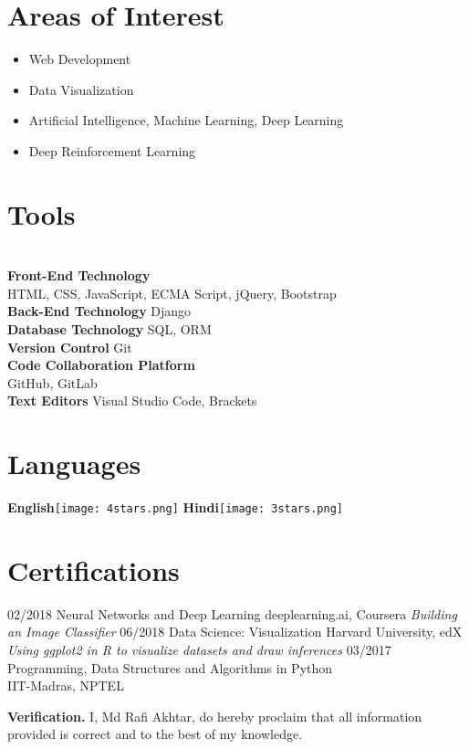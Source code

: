 \documentclass[]{friggeri-cv}
\begin{document}
\section{Areas of Interest}
\begin{itemize}
    \item Web Development
    \item Data Visualization
    \item Artificial Intelligence, Machine Learning, Deep Learning
    \item Deep Reinforcement Learning
\end{itemize}

\begin{aside}
\section{Tools}
\textbf{\\Front-End Technology} {\\HTML, CSS, JavaScript, ECMA Script, jQuery, Bootstrap}
\textbf{\\Back-End Technology} {Django}
\textbf{\\Database Technology} {SQL, ORM}
\textbf{\\Version Control} {Git}
\textbf{\\Code Collaboration Platform} {\\GitHub, GitLab}
\textbf{\\Text Editors} {Visual Studio Code, Brackets}
    ~
  \section{Languages}
    \textbf{English}\texttt{[image: 4stars.png]}
    \textbf{Hindi}\texttt{[image: 3stars.png]}
    ~
\end{aside}
\section{Certifications}
\begin{entrylist}
  \entry
    {02/2018}
    {Neural Networks and Deep Learning}
    {deeplearning.ai, Coursera}
    {\emph{Building an Image Classifier}}
  \entry
    {06/2018}
    {Data Science: Visualization}
    {Harvard University, edX}
    {\emph{Using ggplot2 in R to visualize datasets and draw inferences}}
  \entry
    {03/2017}
    {Programming, Data Structures and Algorithms in Python\\}
    {IIT-Madras, NPTEL}
    
\end{entrylist}

\textbf{Verification.} I, Md Rafi Akhtar, do hereby proclaim that all information provided is correct and to the best of my knowledge.
\end{document}
